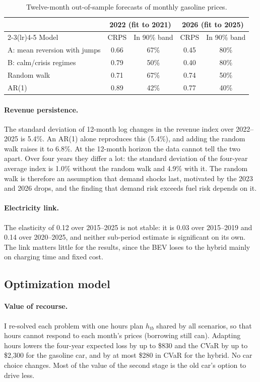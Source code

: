 \documentclass[11pt]{article}
\begin{document}
\begin{table}[ht]
\centering
\caption{Twelve-month out-of-sample forecasts of monthly gasoline prices.}\label{tab:bench}
\small
\begin{tabular}{@{}lcccc@{}}
\toprule
 & \multicolumn{2}{c}{2022 (fit to 2021)} & \multicolumn{2}{c}{2026 (fit to 2025)} \\
\cmidrule(lr){2-3}\cmidrule(lr){4-5}
Model & CRPS & In 90\% band & CRPS & In 90\% band \\
\midrule
A: mean reversion with jumps & 0.66 & 67\% & 0.45 & 80\% \\
B: calm/crisis regimes & 0.79 & 50\% & 0.40 & 80\% \\
Random walk & 0.71 & 67\% & 0.74 & 50\% \\
AR(1) & 0.89 & 42\% & 0.77 & 40\% \\
\bottomrule
\end{tabular}
\end{table}

\paragraph{Revenue persistence.} The standard deviation of 12-month log changes in the revenue index over 2022--2025 is 5.4\%. An AR(1) alone reproduces this (5.4\%), and adding the random walk raises it to 6.8\%. At the 12-month horizon the data cannot tell the two apart. Over four years they differ a lot: the standard deviation of the four-year average index is 1.0\% without the random walk and 4.9\% with it. The random walk is therefore an assumption that demand shocks last, motivated by the 2023 and 2026 drops, and the finding that demand risk exceeds fuel risk depends on it.

\paragraph{Electricity link.} The elasticity of 0.12 over 2015--2025 is not stable: it is 0.03 over 2015--2019 and 0.14 over 2020--2025, and neither sub-period estimate is significant on its own. The link matters little for the results, since the BEV loses to the hybrid mainly on charging time and fixed cost.

\subsection{Optimization model}

\paragraph{Value of recourse.} I re-solved each problem with one hours plan $h_{tb}$ shared by all scenarios, so that hours cannot respond to each month's prices (borrowing still can). Adapting hours lowers the four-year expected loss by up to \$830 and the CVaR by up to \$2{,}300 for the gasoline car, and by at most \$280 in CVaR for the hybrid. No car choice changes. Most of the value of the second stage is the old car's option to drive less.
\end{document}
